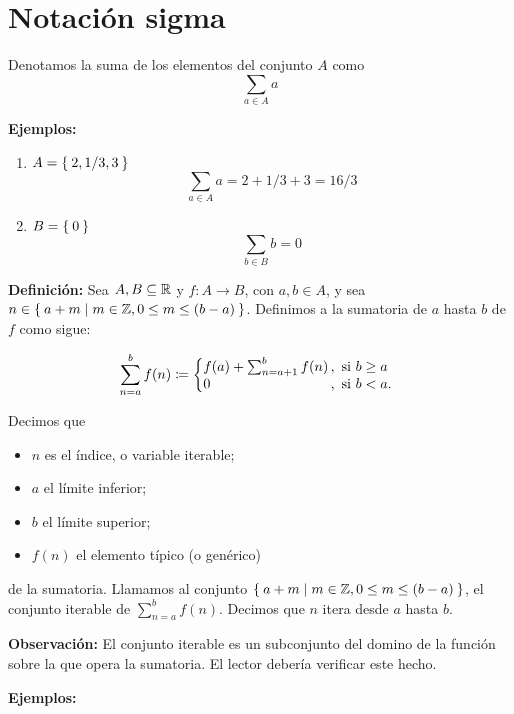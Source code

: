 \part*{Notación sigma}

Denotamos la suma de los elementos del conjunto $A$ como \[\sum_{a\in A} a\]

\textbf{Ejemplos:}

\begin{enumerate}
  \item $A=\Set{2, 1/3, 3}$ \[\sum_{a\in A} a = 2 + 1/3 + 3 = 16/3\]
  \item $B=\Set{0}$ \[\sum_{b\in B} b = 0\]
\end{enumerate}

\textbf{Definición:} Sea $A, B\subseteq \mathbb{R}$ y $f:A \to B$, con $a,b\in A$, y sea $n \in \Set{a + m | m\in \mathbb{Z}, 0\leq m \leq (b-a)}$. Definimos a la sumatoria de $a$ hasta $b$ de $f$ como sigue:

\[
    \sum_{n=a}^{b} f(n) \defined \left\{
    \begin{array}{@{}l@{\thinspace}l}
    f(a) + \sum_{n=a+1}^{b} f(n) &,  \ \text{si}  \ b\geq a\\
    0 &,  \ \text{si}  \ b<a.
    \end{array} \right. \]

Decimos que
\begin{itemize}
  \item $n$ es el índice, o variable iterable;
  \item $a$ el límite inferior;
  \item $b$ el límite superior;
  \item $f(n)$ el elemento típico (o genérico)
\end{itemize}
de la sumatoria. Llamamos al conjunto $\Set{a + m | m\in \mathbb{Z}, 0\leq m \leq (b-a)}$, el conjunto iterable de $\sum_{n=a}^{b} f(n)$. Decimos que $n$ itera desde $a$ hasta $b$.

\textbf{Observación:} El conjunto iterable es un subconjunto del domino de la función sobre la que opera la sumatoria. El lector debería verificar este hecho.

\textbf{Ejemplos:}

